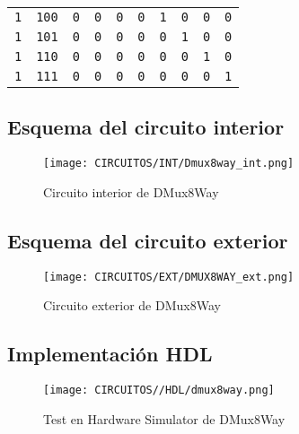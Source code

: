 \documentclass[12pt]{article}
\begin{document}
\begin{table}[H]
{\begin{tabular}{@{}llllllllll@{}}
        \texttt{1} & \texttt{100} & \texttt{0} & \texttt{0} & \texttt{0} & \texttt{0} & \texttt{1} & \texttt{0} & \texttt{0} & \texttt{0} \\
        \texttt{1} & \texttt{101} & \texttt{0} & \texttt{0} & \texttt{0} & \texttt{0} & \texttt{0} & \texttt{1} & \texttt{0} & \texttt{0} \\
        \texttt{1} & \texttt{110} & \texttt{0} & \texttt{0} & \texttt{0} & \texttt{0} & \texttt{0} & \texttt{0} & \texttt{1} & \texttt{0} \\
        \texttt{1} & \texttt{111} & \texttt{0} & \texttt{0} & \texttt{0} & \texttt{0} & \texttt{0} & \texttt{0} & \texttt{0} & \texttt{1} \\ \bottomrule
        \end{tabular}%
        }
        \end{table}
        


    \subsection{Esquema del circuito interior}
        \begin{figure}[H]
            \centering
            \texttt{[image: CIRCUITOS/INT/Dmux8way\_int.png]}            \caption{Circuito interior de DMux8Way \cite{circuitverse}}
            \label{fig:dmux8way_int}
        \end{figure}
    \subsection{Esquema del circuito exterior}
        \begin{figure}[H]
            \centering
            \texttt{[image: CIRCUITOS/EXT/DMUX8WAY\_ext.png]}            \caption{Circuito exterior de DMux8Way \cite{circuitverse}}
            \label{fig:dmux8way_ext}
        \end{figure}
    \subsection{Implementación HDL}
        \begin{figure}[H]
            \centering
            \texttt{[image: CIRCUITOS//HDL/dmux8way.png]}
            \caption{Test en Hardware Simulator de DMux8Way \cite{nand2tetris}}
            \label{fig:hdldmux8way}
        \end{figure}
\end{document}
